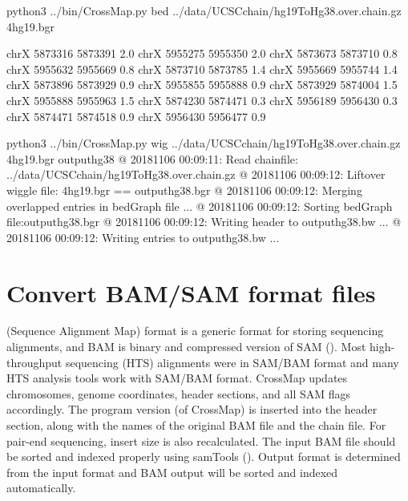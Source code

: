 \documentclass[letterpaper,10pt,english]{sphinxmanual}
\begin{document}
\begin{sphinxVerbatim}[commandchars=\\\{\}]
\PYGZdl{} python3 ../bin/CrossMap.py bed ../data/UCSC\PYGZus{}chain/hg19ToHg38.over.chain.gz 4\PYGZus{}hg19.bgr

chrX   5873316 5873391 2.0     \PYGZhy{}\PYGZgt{}      chrX    5955275 5955350 2.0
chrX   5873673 5873710 0.8     \PYGZhy{}\PYGZgt{}      chrX    5955632 5955669 0.8
chrX   5873710 5873785 1.4     \PYGZhy{}\PYGZgt{}      chrX    5955669 5955744 1.4
chrX   5873896 5873929 0.9     \PYGZhy{}\PYGZgt{}      chrX    5955855 5955888 0.9
chrX   5873929 5874004 1.5     \PYGZhy{}\PYGZgt{}      chrX    5955888 5955963 1.5
chrX   5874230 5874471 0.3     \PYGZhy{}\PYGZgt{}      chrX    5956189 5956430 0.3
chrX   5874471 5874518 0.9     \PYGZhy{}\PYGZgt{}      chrX    5956430 5956477 0.9

\PYGZdl{} python3 ../bin/CrossMap.py wig ../data/UCSC\PYGZus{}chain/hg19ToHg38.over.chain.gz 4\PYGZus{}hg19.bgr output\PYGZus{}hg38
@ 2018\PYGZhy{}11\PYGZhy{}06 00:09:11: Read chain\PYGZus{}file:  ../data/UCSC\PYGZus{}chain/hg19ToHg38.over.chain.gz
@ 2018\PYGZhy{}11\PYGZhy{}06 00:09:12: Liftover wiggle file: 4\PYGZus{}hg19.bgr ==\PYGZgt{} output\PYGZus{}hg38.bgr
@ 2018\PYGZhy{}11\PYGZhy{}06 00:09:12: Merging overlapped entries in bedGraph file ...
@ 2018\PYGZhy{}11\PYGZhy{}06 00:09:12: Sorting bedGraph file:output\PYGZus{}hg38.bgr
@ 2018\PYGZhy{}11\PYGZhy{}06 00:09:12: Writing header to \PYGZdq{}output\PYGZus{}hg38.bw\PYGZdq{} ...
@ 2018\PYGZhy{}11\PYGZhy{}06 00:09:12: Writing entries to \PYGZdq{}output\PYGZus{}hg38.bw\PYGZdq{} ...
\end{sphinxVerbatim}


\section{Convert BAM/SAM format files}
\label{\detokenize{index:bam-conversion}}\label{\detokenize{index:convert-bam-sam-format-files}}
 (Sequence Alignment Map) format
is a generic format for storing sequencing alignments, and BAM is binary and compressed
version of SAM ().
Most high-throughput sequencing  (HTS) alignments were in SAM/BAM format and many HTS analysis
tools work with SAM/BAM format. CrossMap updates chromosomes, genome coordinates, header
sections, and all SAM flags accordingly.  The program version (of CrossMap) is inserted into
the header section, along with  the names of the original BAM file and the chain file.  For
pair-end sequencing, insert size is also recalculated. The input BAM file should be sorted
and indexed properly using samTools ().
Output format is determined from the input format and BAM output will be sorted and indexed automatically.
\end{document}
